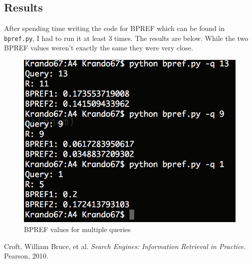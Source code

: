 \documentclass[10pt,letterpaper,bibliography=totoc]{scrartcl}
\begin{document}
\subsection{Results}
After spending time writing the code for BPREF which can be found in \texttt{bpref.py}, I had to run it at least 3 times. The results are below. While the two BPREF values weren't exactly the same they were very close.

\begin{figure}[h!]
\centering
\label{fig:bpref}
\includegraphics[scale=.5]{bpref.png}
\caption{BPREF values for multiple queries}
\end{figure}

\clearpage
\begin{thebibliography}{9}
    Croft, William Bruce, et al. \textit{Search Engines: Information Retrieval in Practice}. Pearson, 2010.
\end{thebibliography}
\end{document}
